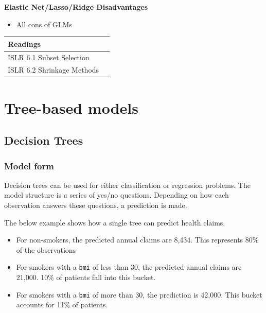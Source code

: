 \documentclass[openany]{book}
\providecommand{\tightlist}{%
  \setlength{\itemsep}{0pt}\setlength{\parskip}{0pt}}
\begin{document}
\textbf{Elastic Net/Lasso/Ridge Disadvantages}

\begin{itemize}
\tightlist
\item
  All cons of GLMs
\end{itemize}

\begin{longtable}[]{@{}ll@{}}
\toprule
Readings &\tabularnewline
\midrule
\endhead
ISLR 6.1 Subset Selection &\tabularnewline
ISLR 6.2 Shrinkage Methods &\tabularnewline
\bottomrule
\end{longtable}

\hypertarget{tree-based-models}{%
\chapter{Tree-based models}\label{tree-based-models}}

\hypertarget{decision-trees}{%
\section{Decision Trees}\label{decision-trees}}

\hypertarget{model-form-1}{%
\subsection{Model form}\label{model-form-1}}

Decision trees can be used for either classification or regression problems. The model structure is a series of yes/no questions. Depending on how each observation answers these questions, a prediction is made.

The below example shows how a single tree can predict health claims.

\begin{itemize}
\tightlist
\item
  For non-smokers, the predicted annual claims are 8,434. This represents 80\% of the observations
\item
  For smokers with a \texttt{bmi} of less than 30, the predicted annual claims are 21,000. 10\% of patients fall into this bucket.
\item
  For smokers with a \texttt{bmi} of more than 30, the prediction is 42,000. This bucket accounts for 11\% of patients.
\end{itemize}
\end{document}
